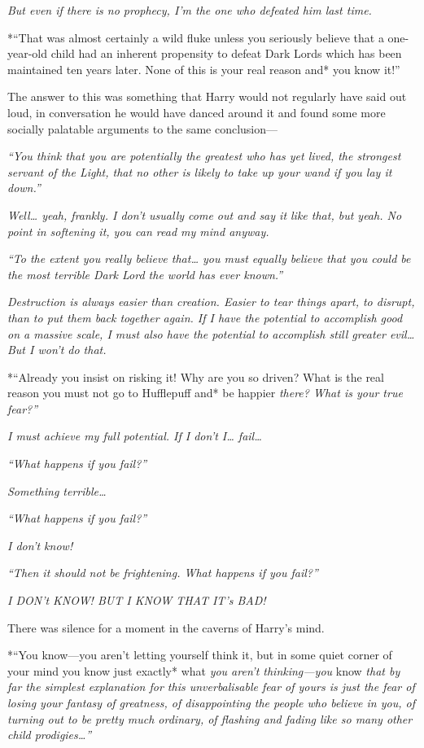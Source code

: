 \emph{But even if there is no prophecy, I'm the one who defeated him
last time.}

*``That was almost certainly a wild fluke unless you seriously believe
that a one-year-old child had an inherent propensity to defeat Dark
Lords which has been maintained ten years later. None of this is your
real reason and* you know it!''

The answer to this was something that Harry would not regularly have
said out loud, in conversation he would have danced around it and found
some more socially palatable arguments to the same conclusion---

\emph{``You think that you are potentially the greatest who has yet
lived, the strongest servant of the Light, that no other is likely to
take up your wand if you lay it down.''}

\emph{Well\ldots{} yeah, frankly. I don't usually come out and say it
like that, but yeah. No point in softening it, you can read my mind
anyway.}

\emph{``To the extent you really believe that\ldots{} you must equally
believe that you could be the most terrible Dark Lord the world has ever
known.''}

\emph{Destruction is always easier than creation. Easier to tear things
apart, to disrupt, than to put them back together again. If I have the
potential to accomplish good on a massive scale, I must also have the
potential to accomplish still greater evil\ldots{} But I won't do that.}

*``Already you insist on risking it! Why are you so driven? What is the
real reason you must not go to Hufflepuff and* be happier \emph{there?
What is your true fear?''}

\emph{I must achieve my full potential. If I don't I\ldots{}
fail\ldots{}}

\emph{``What happens if you fail?''}

\emph{Something terrible\ldots{}}

\emph{``What happens if you fail?''}

\emph{I don't know!}

\emph{``Then it should not be frightening. What happens if you fail?''}

\emph{I DON't KNOW! BUT I KNOW THAT IT's BAD!}

There was silence for a moment in the caverns of Harry's mind.

*``You know---you aren't letting yourself think it, but in some quiet
corner of your mind you know just exactly* what \emph{you aren't
thinking---you} know \emph{that by far the simplest explanation for this
unverbalisable fear of yours is just the fear of losing your fantasy of
greatness, of disappointing the people who believe in you, of turning
out to be pretty much ordinary, of flashing and fading like so many
other child prodigies\ldots{}''}

